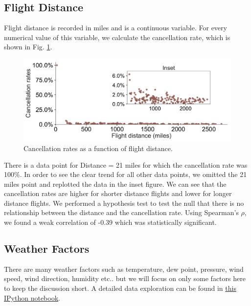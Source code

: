 \documentclass[12pt]{article}
\begin{document}
\subsection{Flight Distance}
\label{subsec:flightdistance}
Flight distance is recorded in miles and is a continuous variable. For every numerical value of this variable, we calculate the cancellation rate, which is shown in Fig. \ref{fig:distancecanrate}.   
\begin{figure}[h!]
\begin{center}
\includegraphics[width=6in]{distance_canrate.pdf}
\end{center}
\caption{\label{fig:distancecanrate}
Cancellation rates as a function of flight distance.}
\end{figure}
There is a data point for Distance = 21 miles for which the cancellation rate was 100$\%$. In order to see the clear trend for all other data points, we omitted the 21 miles point and replotted the data in the inset figure. We can see that the cancellation rates are higher for shorter distance flights and lower for longer distance flights. We performed a hypothesis test to test the null that there is no relationship between the distance and the cancellation rate. Using Spearman's $\rho$, we found a weak correlation of -0.39 which was statistically significant. 
\subsection{Weather Factors}
\label{subsec:weatherfactors}
There are many weather factors such as temperature, dew point, pressure, wind speed, wind direction, humidity etc.. but we will focus on only some factors here to keep the discussion short. A detailed data exploration can be found in \href{https://github.com/aajains/springboard-datascience-intensive/blob/master/capstone_project/EDA/ExploratoryDataAnalysis.ipynb}{this IPython notebook}. 
\end{document}
